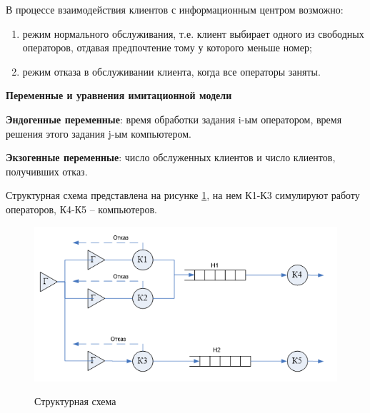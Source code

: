 В процессе взаимодействия клиентов с информационным центром возможно:
\begin{enumerate}
	\item режим нормального обслуживания, т.е. клиент выбирает одного из свободных операторов, отдавая предпочтение тому у которого меньше номер;
	\item режим отказа в обслуживании клиента, когда все операторы заняты.
\end{enumerate}

\textbf{Переменные и уравнения имитационной модели}  

\textbf{Эндогенные переменные}: время обработки задания i-ым оператором, время решения этого задания j-ым компьютером.

\textbf{Экзогенные переменные}: число обслуженных клиентов и число клиентов, получивших отказ.

Структурная схема представлена на рисунке \ref{fig2:image}, на нем К1-К3 симулируют работу операторов, К4-К5 -- компьютеров.
\begin{figure}[h]
	\begin{center}
		{\includegraphics[scale = 0.9]{img/struct.png}}
		\caption{Структурная схема}
		\label{fig2:image}
	\end{center}
\end{figure}

